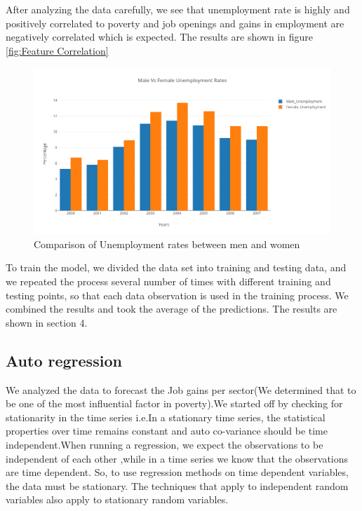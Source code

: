 \documentclass[11pt,letterpaper]{article}
\begin{document}
After analyzing the data carefully, we see that unemployment rate is highly and positively correlated to poverty and job openings and gains in employment are negatively correlated which is expected. The results are shown in figure \ref{fig:Feature Correlation}

\begin{figure}
\centering
\includegraphics[width=\linewidth]{"./pictures/MaleVsFemaleUnemployment"}
\caption{Comparison of Unemployment rates between men and women}
\label{fig:MaleVsFemaleUnemployment}
\end{figure}

To train the model, we divided the data set into training and testing data, and we repeated the process several number of times with different training and testing points, so that each data observation is used in the training process. We combined the results and took the average of the predictions. The results are shown in section 4.

\subsection{Auto regression}
\label{ssec:autoreg}

We analyzed the data to forecast the Job gains per sector(We determined that to be one of the most influential factor in poverty).We started off by checking for stationarity in the time series i.e.In a stationary time series, the statistical properties over time remains constant and auto co-variance should be time independent.When running a  regression, we expect the observations to be independent of each other ,while in a time series we know that the observations are time dependent. So, to use regression methods on time dependent variables, the data must be stationary. The techniques that apply to independent random variables also apply to stationary random variables.
\end{document}
